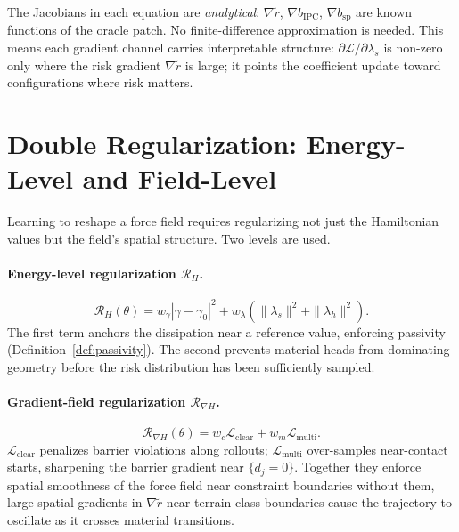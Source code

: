 The Jacobians in each equation are \emph{analytical}:
$\nabla\tilde{r}$, $\nabla b_{\mathrm{IPC}}$, $\nabla b_{\mathrm{sp}}$
are known functions of the oracle patch.
No finite-difference approximation is needed.
This means each gradient channel carries interpretable structure:
$\partial\mathcal{L}/\partial\lambda_s$ is non-zero only where the
risk gradient $\nabla\tilde{r}$ is large; it points the coefficient
update toward configurations where risk matters.

\section{Double Regularization: Energy-Level and Field-Level}
\label{sec:ch4:regularization}

Learning to reshape a force field requires regularizing not just
the Hamiltonian values but the field's spatial structure.
Two levels are used.

\paragraph{Energy-level regularization $\mathcal{R}_H$.}
\begin{equation}
  \mathcal{R}_H(\theta)
  = w_\gamma|\gamma-\gamma_0|^2
  + w_\lambda(\|\lambda_s\|^2+\|\lambda_h\|^2).
  \label{eq:ch4:R_H}
\end{equation}
The first term anchors the dissipation near a reference value,
enforcing passivity (Definition~\ref{def:passivity}).
The second prevents material heads from dominating geometry
before the risk distribution has been sufficiently sampled.

\paragraph{Gradient-field regularization $\mathcal{R}_{\nabla H}$.}
\begin{equation}
  \mathcal{R}_{\nabla H}(\theta)
  = w_c\mathcal{L}_{\mathrm{clear}}
  + w_m\mathcal{L}_{\mathrm{multi}}.
  \label{eq:ch4:R_nablaH}
\end{equation}
$\mathcal{L}_{\mathrm{clear}}$ penalizes barrier violations along
rollouts; $\mathcal{L}_{\mathrm{multi}}$ over-samples near-contact
starts, sharpening the barrier gradient near $\{d_j=0\}$.
Together they enforce spatial smoothness of the force field near
constraint boundaries without them, large spatial gradients in
$\nabla\tilde{r}$ near terrain class boundaries cause the trajectory
to oscillate as it crosses material transitions.

